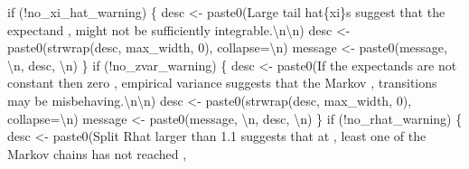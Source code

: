 \documentclass[
  letterpaper,
  DIV=11,
  numbers=noendperiod]{scrartcl}
\newenvironment{Shaded}{\begin{snugshade}}{\end{snugshade}}
\newcommand{\AttributeTok}[1]{\textcolor[rgb]{0.40,0.45,0.13}{#1}}
\newcommand{\ControlFlowTok}[1]{\textcolor[rgb]{0.00,0.23,0.31}{#1}}
\newcommand{\DecValTok}[1]{\textcolor[rgb]{0.68,0.00,0.00}{#1}}
\newcommand{\FunctionTok}[1]{\textcolor[rgb]{0.28,0.35,0.67}{#1}}
\newcommand{\NormalTok}[1]{\textcolor[rgb]{0.00,0.23,0.31}{#1}}
\newcommand{\OtherTok}[1]{\textcolor[rgb]{0.00,0.23,0.31}{#1}}
\newcommand{\SpecialCharTok}[1]{\textcolor[rgb]{0.37,0.37,0.37}{#1}}
\newcommand{\StringTok}[1]{\textcolor[rgb]{0.13,0.47,0.30}{#1}}
\begin{document}
\begin{Shaded}
\begin{Highlighting}[]
  \ControlFlowTok{if}\NormalTok{ (}\SpecialCharTok{!}\NormalTok{no\_xi\_hat\_warning) \{}
\NormalTok{    desc }\OtherTok{\textless{}{-}} \FunctionTok{paste0}\NormalTok{(}\StringTok{\textquotesingle{}Large tail hat\{xi\}s suggest that the expectand \textquotesingle{}}\NormalTok{,}
                   \StringTok{\textquotesingle{} might not be sufficiently integrable.}\SpecialCharTok{\textbackslash{}n\textbackslash{}n}\StringTok{\textquotesingle{}}\NormalTok{)}
\NormalTok{    desc }\OtherTok{\textless{}{-}} \FunctionTok{paste0}\NormalTok{(}\FunctionTok{strwrap}\NormalTok{(desc, max\_width, }\DecValTok{0}\NormalTok{), }\AttributeTok{collapse=}\StringTok{\textquotesingle{}}\SpecialCharTok{\textbackslash{}n}\StringTok{\textquotesingle{}}\NormalTok{)}
\NormalTok{    message }\OtherTok{\textless{}{-}} \FunctionTok{paste0}\NormalTok{(message, }\StringTok{\textquotesingle{}}\SpecialCharTok{\textbackslash{}n}\StringTok{\textquotesingle{}}\NormalTok{, desc, }\StringTok{\textquotesingle{}}\SpecialCharTok{\textbackslash{}n}\StringTok{\textquotesingle{}}\NormalTok{)}
\NormalTok{  \}}
  \ControlFlowTok{if}\NormalTok{ (}\SpecialCharTok{!}\NormalTok{no\_zvar\_warning) \{}
\NormalTok{    desc }\OtherTok{\textless{}{-}} \FunctionTok{paste0}\NormalTok{(}\StringTok{\textquotesingle{}If the expectands are not constant then zero \textquotesingle{}}\NormalTok{,}
                   \StringTok{\textquotesingle{}empirical variance suggests that the Markov \textquotesingle{}}\NormalTok{,}
                   \StringTok{\textquotesingle{}transitions may be misbehaving.}\SpecialCharTok{\textbackslash{}n\textbackslash{}n}\StringTok{\textquotesingle{}}\NormalTok{)}
\NormalTok{    desc }\OtherTok{\textless{}{-}} \FunctionTok{paste0}\NormalTok{(}\FunctionTok{strwrap}\NormalTok{(desc, max\_width, }\DecValTok{0}\NormalTok{), }\AttributeTok{collapse=}\StringTok{\textquotesingle{}}\SpecialCharTok{\textbackslash{}n}\StringTok{\textquotesingle{}}\NormalTok{)}
\NormalTok{    message }\OtherTok{\textless{}{-}} \FunctionTok{paste0}\NormalTok{(message, }\StringTok{\textquotesingle{}}\SpecialCharTok{\textbackslash{}n}\StringTok{\textquotesingle{}}\NormalTok{, desc, }\StringTok{\textquotesingle{}}\SpecialCharTok{\textbackslash{}n}\StringTok{\textquotesingle{}}\NormalTok{)}
\NormalTok{  \}}
  \ControlFlowTok{if}\NormalTok{ (}\SpecialCharTok{!}\NormalTok{no\_rhat\_warning) \{}
\NormalTok{    desc }\OtherTok{\textless{}{-}} \FunctionTok{paste0}\NormalTok{(}\StringTok{\textquotesingle{}Split Rhat larger than 1.1 suggests that at \textquotesingle{}}\NormalTok{,}
                   \StringTok{\textquotesingle{}least one of the Markov chains has not reached \textquotesingle{}}\NormalTok{,}

\end{Highlighting}
\end{Shaded}
\end{document}

